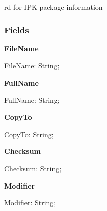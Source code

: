 \documentclass{report}
\newif\ifpdf
\begin{document}
rd for IPK package information\subsubsection*{\large{\textbf{Fields}}\normalsize\hspace{1ex}\hfill}
\begin{list}{}{
\setlength{\itemindent}{0cm}
\setlength{\listparindent}{0cm}
\setlength{\leftmargin}{\evensidemargin}
\addtolength{\leftmargin}{\tmplength}
\settowidth{\labelsep}{X}
\addtolength{\leftmargin}{\labelsep}
\setlength{\labelwidth}{\tmplength}
}
\label{prjwizard.TPackageFile-FileName}
\item[\textbf{FileName}\hfill]
\ifpdf
\begin{flushleft}
\fi
\begin{ttfamily}
FileName: String;\end{ttfamily}

\ifpdf
\end{flushleft}
\fi


\par  \label{prjwizard.TPackageFile-FullName}
\item[\textbf{FullName}\hfill]
\ifpdf
\begin{flushleft}
\fi
\begin{ttfamily}
FullName: String;\end{ttfamily}

\ifpdf
\end{flushleft}
\fi


\par  \label{prjwizard.TPackageFile-CopyTo}
\item[\textbf{CopyTo}\hfill]
\ifpdf
\begin{flushleft}
\fi
\begin{ttfamily}
CopyTo: String;\end{ttfamily}

\ifpdf
\end{flushleft}
\fi


\par  \label{prjwizard.TPackageFile-Checksum}
\item[\textbf{Checksum}\hfill]
\ifpdf
\begin{flushleft}
\fi
\begin{ttfamily}
Checksum: String;\end{ttfamily}

\ifpdf
\end{flushleft}
\fi


\par  \label{prjwizard.TPackageFile-Modifier}
\item[\textbf{Modifier}\hfill]
\ifpdf
\begin{flushleft}
\fi
\begin{ttfamily}
Modifier: String;\end{ttfamily}

\ifpdf
\end{flushleft}
\fi


\par  \end{list}
\ifpdf
\end{document}

